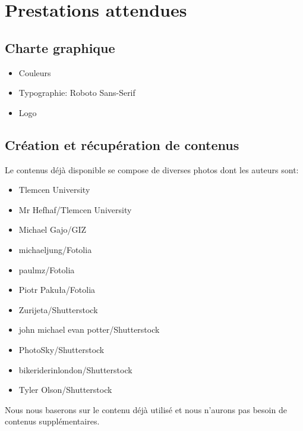 \documentclass[oneside]{report}
\newcommand{\writecol}[1] {
	\subitem{\textcolor[HTML]{#1}{\# #1}}
}
\begin{document}
	\chapter{Prestations attendues}
	{
		\section{Charte graphique}
			\begin{itemize}
				\item{Couleurs}
					\writecol{639D35}
					\writecol{040707}
					\writecol{868786}
					\writecol{005899}
				\item{Typographie: Roboto Sans-Serif}
				\item{Logo}
			\end{itemize}
		\section{Création et récupération de contenus}
		{
			\par Le contenus déjà disponible se compose de diverses photos dont les auteurs sont:
			\vspace{.5cm}
			\begin{itemize}
				\item Tlemcen University
				\item Mr Hefhaf/Tlemcen University
				\item Michael Gajo/GIZ
				\item michaeljung/Fotolia
				\item paulmz/Fotolia
				\item Piotr Pakuła/Fotolia
				\item Zurijeta/Shutterstock
				\item john michael evan potter/Shutterstock
				\item PhotoSky/Shutterstock
				\item bikeriderinlondon/Shutterstock
				\item Tyler Olson/Shutterstock
			\end{itemize}
			\vspace{.5cm}
			\par Nous nous baserons sur le contenu déjà utilisé et nous n'aurons pas besoin de contenus supplémentaires.
			\vspace{.5cm}
		}
}
\end{document}

